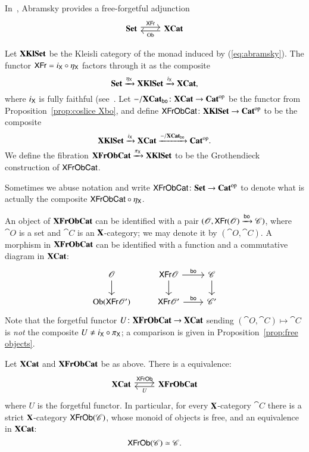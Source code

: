 \documentclass[12pt,oneside,article,draft]{memoir}
\begin{document}
In~\cite{Abramsky?}, Abramsky provides a free-forgetful adjunction
\begin{equation}\label{eq:abramsky}
\begin{tikzcd}
\Cat{Set}\arrow[r, shift left=.5ex, "\Fun{XFr}"]&\XCat\arrow[l, shift left=.5ex,"\Ob"]
\end{tikzcd}
\end{equation}

\begin{definition}\label{def:XKlSet XFrObCat}

Let $\mathbf{XKlSet}$ be the Kleisli category of the monad induced by (\ref{eq:abramsky}). The functor $\mathsf{XFr}=i_{\mathsf{X}}\circ\eta_{\mathsf{X}}$ factors through it as the composite 
$$\mathbf{Set}\xrightarrow{\eta_{\mathsf{X}}}\mathbf{XKlSet}\xrightarrow{i_{\mathsf{X}}}\mathbf{XCat},$$ 
where $i_{\mathsf{X}}$ is fully faithful (see~\cite[Proposition 4.2.1]{BorceuxV2}.  Let $-/\mathbf{XCat}_{\mathsf{bo}}\colon\mathbf{XCat}\to{\mathbf{Cat}}^{\text{op}}$ be the functor from Proposition~\ref{prop:coslice Xbo}, and define $\mathsf{XFrObCat}\colon\mathbf{XKlSet}\to{\mathbf{Cat}}^{\text{op}}$ to be the composite
$$\mathbf{XKlSet}\xrightarrow{i_{\mathsf{X}}}\mathbf{XCat}\xrightarrow{-/\mathbf{XCat}_{\mathsf{bo}}}{\mathbf{Cat}}^{\text{op}}.$$
We define the fibration $\mathbf{XFrObCat}\xrightarrow{\pi_{\mathsf{X}}}\mathbf{XKlSet}$ to be the Grothendieck construction of $\mathsf{XFrObCat}$. 

Sometimes we abuse notation and write $\mathsf{XFrObCat}\colon\mathbf{Set}\to{\mathbf{Cat}}^{\text{op}}$ to denote what is actually the composite $\mathsf{XFrObCat}\circ\eta_{\mathsf{X}}$.

\end{definition}

An object of $\mathbf{XFrObCat}$ can be identified with a pair $(\mathscr{O},\mathsf{XFr}(\mathscr{O})\xrightarrow{\mathsf{bo}}\mathscr{C})$, where $\cat{O}$ is a set and $\cat{C}$ is an $\mathbf{X}$-category; we may denote it by $(\cat{O},\cat{C})$. A morphism in $\mathbf{XFrObCat}$ can be identified with a function and a commutative diagram in $\mathbf{XCat}$:
$$
\begin{tikzcd}
\cat{O}\ar[d]&\Fun{XFr}\cat{O}\ar[r,"\bo"]\ar[d]&\cat{C}\ar[d]\\
\Ob(\Fun{XFr}\cat{O'})&\Fun{XFr}\cat{O'}\ar[r,"\bo"]&\cat{C'}
\end{tikzcd}
$$
Note that the forgetful functor $U\colon\mathbf{XFrObCat}\to\mathbf{XCat}$ sending $(\cat{O},\cat{C})\mapsto\cat{C}$ is \emph{not} the composite $U\neq i_{\mathsf{X}}\circ\pi_{\mathsf{X}}$; a comparison is given in Proposition~\ref{prop:free objects}.

\begin{proposition}\label{prop:free objects}

Let $\mathbf{XCat}$ and $\mathbf{XFrObCat}$ be as above. There is a equivalence:
$$
\begin{tikzcd}
\XCat\arrow[r, shift left=.5ex, "\Fun{XFrOb}"]&\Cat{XFrObCat}\arrow[l, shift left=.5ex,"U"]
\end{tikzcd}
$$
where $U$ is the forgetful functor. In particular, for every $\mathbf{X}$-category $\cat{C}$ there is a strict $\mathbf{X}$-category $\mathsf{XFrOb}(\mathscr{C})$, whose monoid of objects is free, and an equivalence in $\mathbf{XCat}$:
$$\mathsf{XFrOb}(\mathscr{C})\simeq\mathscr{C}.$$

\end{proposition}
\end{document}
